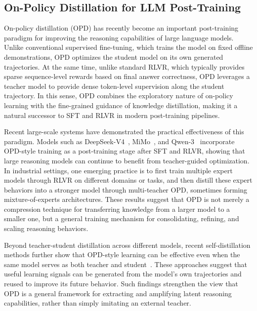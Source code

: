 \subsection{On-Policy Distillation for LLM Post-Training}

On-policy distillation (OPD) has recently become an important post-training paradigm for improving the reasoning capabilities of large language models. Unlike conventional supervised fine-tuning, which trains the model on fixed offline demonstrations, OPD optimizes the student model on its own generated trajectories. At the same time, unlike standard RLVR, which typically provides sparse sequence-level rewards based on final answer correctness, OPD leverages a teacher model to provide dense token-level supervision along the student trajectory. In this sense, OPD combines the exploratory nature of on-policy learning with the fine-grained guidance of knowledge distillation, making it a natural successor to SFT and RLVR in modern post-training pipelines.

Recent large-scale systems have demonstrated the practical effectiveness of this paradigm. Models such as DeepSeek-V4~\cite{deepseekv4}, MiMo~\cite{xiao2026mimo}, and Qwen-3~\cite{yang2025qwen3} incorporate OPD-style training as a post-training stage after SFT and RLVR, showing that large reasoning models can continue to benefit from teacher-guided optimization. In industrial settings, one emerging practice is to first train multiple expert models through RLVR on different domains or tasks, and then distill these expert behaviors into a stronger model through multi-teacher OPD, sometimes forming mixture-of-experts architectures. These results suggest that OPD is not merely a compression technique for transferring knowledge from a larger model to a smaller one, but a general training mechanism for consolidating, refining, and scaling reasoning behaviors.

Beyond teacher-student distillation across different models, recent self-distillation methods further show that OPD-style learning can be effective even when the same model serves as both teacher and student~\cite{zhao2026self,shenfeld2026self,hubotter2026reinforcement}. These approaches suggest that useful learning signals can be generated from the model's own trajectories and reused to improve its future behavior. Such findings strengthen the view that OPD is a general framework for extracting and amplifying latent reasoning capabilities, rather than simply imitating an external teacher.

